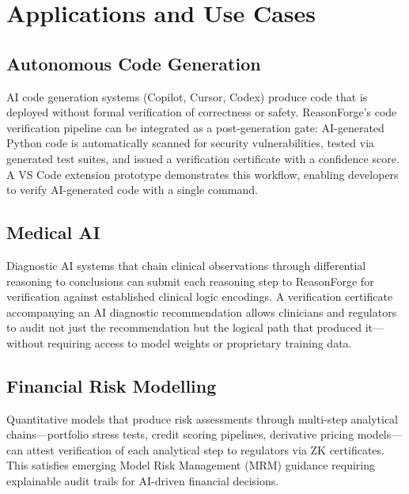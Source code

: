 \documentclass[11pt,a4paper]{article}
\begin{document}
\section{Applications and Use Cases}
\label{sec:applications}

\subsection{Autonomous Code Generation}

AI code generation systems (Copilot, Cursor, Codex) produce code that is
deployed without formal verification of correctness or safety.
ReasonForge's code verification pipeline can be integrated as a
post-generation gate: AI-generated Python code is automatically scanned
for security vulnerabilities, tested via generated test suites, and
issued a verification certificate with a confidence score.  A VS Code
extension prototype demonstrates this workflow, enabling developers to
verify AI-generated code with a single command.

\subsection{Medical AI}

Diagnostic AI systems that chain clinical observations through
differential reasoning to conclusions can submit each reasoning step to
ReasonForge for verification against established clinical logic
encodings.  A verification certificate accompanying an AI diagnostic
recommendation allows clinicians and regulators to audit not just the
recommendation but the logical path that produced it---without requiring
access to model weights or proprietary training data.

\subsection{Financial Risk Modelling}

Quantitative models that produce risk assessments through multi-step
analytical chains---portfolio stress tests, credit scoring pipelines,
derivative pricing models---can attest verification of each analytical
step to regulators via ZK certificates.  This satisfies emerging Model
Risk Management (MRM) guidance requiring explainable audit trails for
AI-driven financial decisions.
\end{document}
